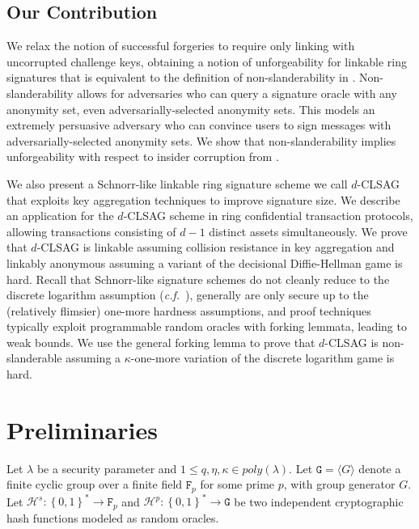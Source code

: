 \documentclass{llncs}
\newcommand{\F}{\texttt{F}_p}
\newcommand{\G}{\texttt{G}}
\newcommand{\Hp}{\mathcal{H}^p}
\newcommand{\Hs}{\mathcal{H}^s}
\begin{document}
\subsection{Our Contribution}

We relax the notion of successful forgeries to require only linking with uncorrupted challenge keys, obtaining a notion of unforgeability for linkable ring signatures that is equivalent to the definition of non-slanderability in \cite{au2006short}.  Non-slanderability allows for adversaries who can query a signature oracle with any anonymity set, even adversarially-selected anonymity sets. This models an extremely persuasive adversary who can convince users to sign messages with adversarially-selected anonymity sets. We show that non-slanderability implies unforgeability with respect to insider corruption from \cite{bender2006ring}.

We also present a Schnorr-like linkable ring signature scheme we call $d$-CLSAG that exploits key aggregation techniques to improve signature size. We describe an application for the $d$-CLSAG scheme in ring confidential transaction protocols, allowing transactions consisting of $d-1$ distinct assets simultaneously. We prove that $d$-CLSAG is linkable assuming collision resistance in key aggregation and linkably anonymous assuming a variant of the decisional Diffie-Hellman game is hard. Recall that Schnorr-like signature schemes do not cleanly reduce to the discrete logarithm assumption (\textit{c.f.}\ \cite{paillier2005discrete}), generally are only secure up to the (relatively flimsier) one-more hardness assumptions, and proof techniques typically exploit programmable random oracles with forking lemmata, leading to weak bounds. We use the general forking lemma to prove that $d$-CLSAG is non-slanderable assuming a $\kappa$-one-more variation of the discrete logarithm game is hard.


\section{Preliminaries}

Let $\lambda$ be a security parameter and $1 \leq q, \eta, \kappa \in poly(\lambda)$. Let $\G = \langle G \rangle$ denote a finite cyclic group over a finite field $\F$ for some prime $p$, with group generator $G$.  Let $\Hs:\left\{0,1\right\}^* \to \F$ and $\Hp:\left\{0,1\right\}^* \to \G$ be two independent cryptographic hash functions modeled as random oracles.
\end{document}
